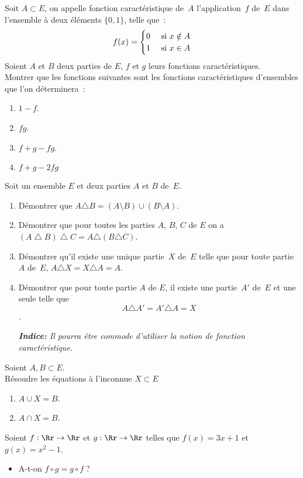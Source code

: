 \documentclass[10pt, a4paper, twocolumn]{homework}
\begin{document}
Soit $A\subset E$, on appelle fonction caractéristique de~$A$
l'application~$f$ de~$E$ dans l'ensemble à deux éléments $\{0, 1\}$, telle
que~:
$$f(x)=\begin{cases}
0&  \text{ si } x\notin A \cr 1& \text{ si } x \in A \cr
\end{cases}$$
Soient $A$ et $B$ deux parties de $E$, $f$ et $g$ leurs fonctions
caractéristiques.\\
Montrer que les fonctions suivantes sont les fonctions
caractéristiques d'ensembles que l'on déterminera~:
\begin{enumerate}
\item $1-f$.
\item $fg$.
\item $f+g-fg$.
\item $f + g - 2fg$
\end{enumerate}
Soit un ensemble $E$ et deux parties $A$ et $B$ de~$E$. 
\begin{enumerate}
\item Démontrer que $A \triangle B = (A \setminus B) \cup(B \setminus A)$.
\item Démontrer que pour toutes les parties $A$, $B$, $C$ de $E$ on a
$(A \bigtriangleup B) \bigtriangleup C = A \triangle(B \triangle C)$.
\item Démontrer qu'il existe une unique partie~$X$ de~$E$ telle que 
pour toute partie~$A$ de~$E$, $A \triangle X = X \triangle A = A$.
\item Démontrer que pour toute partie $A$ de $E$, il existe une partie~$A'$
de~$E$ et une seule telle que $$A \triangle A' = A' \triangle A = X$$.

\textit{ \textbf{Indice:}  \scriptsize Il pourra être commode 
d'utiliser la notion de fonction caractéristique.}
\end{enumerate}
Soient $A, B \subset E$.\\
R\'esoudre les \'equations \`a l'inconnue $X \subset E$
\begin{enumerate}
\item $A \cup X = B$.
\item $A \cap X = B$.
\end{enumerate}
Soient $f : \Rr \rightarrow \Rr$ et $g : \Rr \rightarrow \Rr$ telles que $f(x) =
3x+1$ et $g(x)=x^2-1$.
\begin{itemize}
  \item  A-t-on $f\circ g=g\circ f\;$?
\end{itemize}
\end{document}
